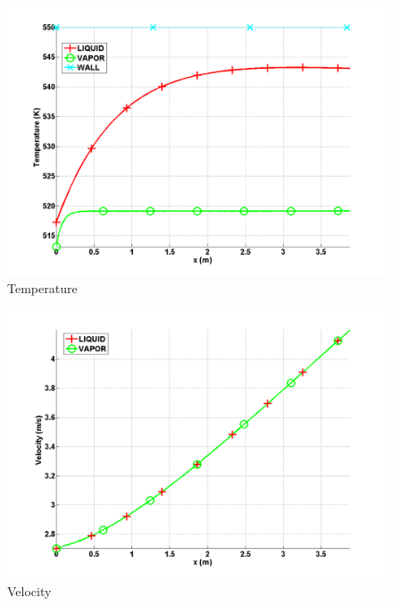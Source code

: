 %
        \begin{figure}[H]
                \centering
                \includegraphics[width=\textwidth]{figures/ANS_WINTER_2014_7Eqn_temperature.png}
                \caption{Temperature}
                \label{fig:temperature}
        \end{figure}%
%            
        \begin{figure}[H]
                \centering
                \includegraphics[width=\textwidth]{figures/ANS_WINTER_2014_7Eqn_velocity.png}
                \caption{Velocity}
                \label{fig:velocity}
        \end{figure}
%
